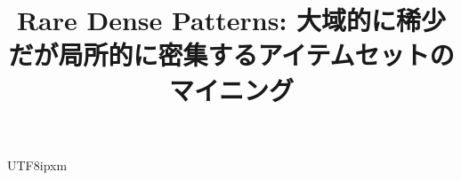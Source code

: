 \documentclass[conference]{IEEEtran}
\begin{document}
\begin{CJK}{UTF8}{ipxm}

\title{Rare Dense Patterns: 大域的に稀少だが局所的に密集するアイテムセットのマイニング}

\author{
}

\maketitle












\end{CJK}
\end{document}
